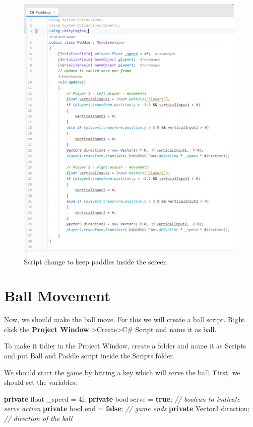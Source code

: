 \documentclass[
]{book}
\newenvironment{Shaded}{\begin{snugshade}}{\end{snugshade}}
\newcommand{\CommentTok}[1]{\textcolor[rgb]{0.56,0.35,0.01}{\textit{#1}}}
\newcommand{\DataTypeTok}[1]{\textcolor[rgb]{0.13,0.29,0.53}{#1}}
\newcommand{\KeywordTok}[1]{\textcolor[rgb]{0.13,0.29,0.53}{\textbf{#1}}}
\newcommand{\NormalTok}[1]{#1}
\begin{document}
\begin{figure}
\centering
\includegraphics{Images/Bounds.png}
\caption{Script change to keep paddles inside the screen}
\end{figure}

\hypertarget{ball-movement}{%
\section{Ball Movement}\label{ball-movement}}

Now, we should make the ball move. For this we will create a ball script. Right click the \textbf{Project Window} \textgreater Create\textgreater C\# Script and name it as ball.

To make it tidier in the Project Window, create a folder and name it as Scripts and put Ball and Paddle script inside the Scripts folder.

We should start the game by hitting a key which will serve the ball. First, we should set the variables:

\begin{Shaded}
\begin{Highlighting}[]
\NormalTok{[SerializeField] }\KeywordTok{private} \DataTypeTok{float}\NormalTok{ _speed = 4f;}
\KeywordTok{private} \DataTypeTok{bool}\NormalTok{ serve = }\KeywordTok{true}\NormalTok{;  }\CommentTok{// boolean to indicate serve action}
\KeywordTok{private} \DataTypeTok{bool}\NormalTok{ end = }\KeywordTok{false}\NormalTok{;  }\CommentTok{// game ends}
\KeywordTok{private}\NormalTok{ Vector3 direction; }\CommentTok{// direction of the ball}
\end{Highlighting}
\end{Shaded}
\end{document}
